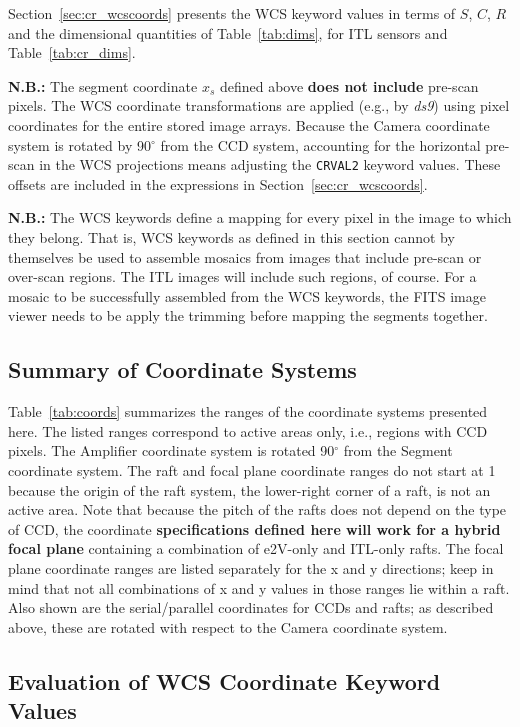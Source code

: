 \documentclass{article}[12pt]
\begin{document}
{Section~\ref{sec:cr_wcscoords} presents the WCS keyword values in terms of $S$, $C$, $R$ and the dimensional quantities of Table~\ref{tab:dims}, for ITL sensors and Table~\ref{tab:cr_dims}.  

{\bf N.B.:} The segment coordinate $x_s$ defined above {\bf does not include} pre-scan pixels.  The WCS coordinate transformations are applied (e.g., by {\it ds9}) using pixel coordinates for the entire stored image arrays.  Because the Camera coordinate system is rotated by 90$^\circ$ from the CCD system, accounting for the horizontal pre-scan in the WCS projections means adjusting the {\tt CRVAL2} keyword values.  These offsets are included in the expressions in Section~\ref{sec:cr_wcscoords}.  

{\bf N.B.:}  The WCS keywords define a mapping for every pixel in the image to which they belong.  That is, WCS keywords as defined in this section cannot by themselves be used to assemble mosaics from images that include pre-scan or over-scan regions.  The ITL images will include such regions, of course.  For a mosaic to be successfully assembled from the WCS keywords, the FITS image viewer needs to be apply the trimming before mapping the segments together.

\subsection{Summary of Coordinate Systems}
Table~\ref{tab:coords} summarizes the ranges of the coordinate systems presented here.  The listed ranges correspond to active areas only, i.e., regions with CCD pixels.  The Amplifier coordinate system is rotated 90$^\circ$ from the Segment coordinate system.  The raft and focal plane coordinate ranges do not start at 1 because the origin of the raft system, the lower-right corner of a raft, is not an active area.  Note that because the pitch of the rafts does not depend on the type of CCD, the coordinate {\bf specifications defined here will work for a hybrid focal plane} containing a combination of e2V-only and ITL-only rafts.  The focal plane coordinate ranges are listed separately for the x and y directions; keep in mind that not all combinations of x and y values in those ranges lie within a raft.  Also shown are the serial/parallel coordinates for CCDs and rafts; as described above, these are rotated with respect to the Camera coordinate system.

\subsection{Evaluation of WCS Coordinate Keyword Values\label{sec:wcscoords}}

}
\end{document}

